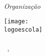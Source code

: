 {\centering\vspace*{10em}\thispagestyle{empty}
{\huge\titulo\par}}
\cleardoublepage
{\centering\vspace*{10em}\thispagestyle{empty}
{\huge\titulo\medskip\par}
{\Large\textls{\autor}\par}
\vspace*{8em}
{\textls{\organizador}}\\
{\small\textit{Organização}}\medskip\par
\vfill\par\bigskip
\texttt{[image: \\logoescola]}\\\bigskip
\logoum\\
{\normalsize\ \cidade, \ano}\par}
\clearpage
